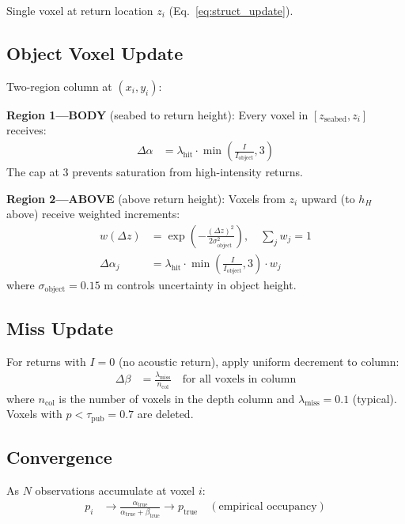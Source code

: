 \documentclass[10pt,twocolumn]{article}
\begin{document}
Single voxel at return location $z_i$ (Eq.~\ref{eq:struct_update}).

\subsection{Object Voxel Update}

Two-region column at $(x_i, y_i)$:

\textbf{Region 1---BODY} (seabed to return height):
Every voxel in $[z_{\text{seabed}}, z_i]$ receives:
\begin{align}
\Delta\alpha &= \lambda_{\text{hit}} \cdot \min\left(\frac{I}{I_{\text{object}}}, 3\right) \label{eq:object_body}
\end{align}
The cap at 3 prevents saturation from high-intensity returns.

\textbf{Region 2---ABOVE} (above return height):
Voxels from $z_i$ upward (to $h_H$ above) receive weighted increments:
\begin{align}
w(\Delta z) &= \exp\left(-\frac{(\Delta z)^2}{2\sigma_{\text{object}}^2}\right), \quad \sum_j w_j = 1 \label{eq:object_above} \\
\Delta\alpha_j &= \lambda_{\text{hit}} \cdot \min\left(\frac{I}{I_{\text{object}}}, 3\right) \cdot w_j
\end{align}
where $\sigma_{\text{object}} = 0.15$ m controls uncertainty in object height.

\subsection{Miss Update}

For returns with $I=0$ (no acoustic return), apply uniform decrement to column:
\begin{align}
\Delta\beta &= \frac{\lambda_{\text{miss}}}{n_{\text{col}}} \quad \text{for all voxels in column} \label{eq:miss_update}
\end{align}
where $n_{\text{col}}$ is the number of voxels in the depth column and $\lambda_{\text{miss}} = 0.1$ (typical). Voxels with $p < \tau_{\text{pub}} = 0.7$ are deleted.

\subsection{Convergence}

As $N$ observations accumulate at voxel $i$:
\begin{align}
p_i &\to \frac{\alpha_{\text{true}}}{\alpha_{\text{true}} + \beta_{\text{true}}} \to p_{\text{true}} \quad (\text{empirical occupancy})
\end{align}
\end{document}

